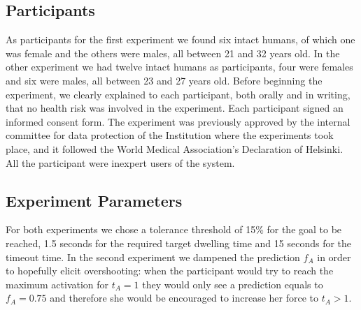 \subsection{Participants}\label{subsec:exp-participants}
As participants for the first experiment we found six intact humans, of which one was female and the others were males, all between 21 and 32 years old. In the other experiment we had twelve intact humans as participants, four were females and six were males, all between 23 and 27 years old. Before beginning the experiment, we clearly explained to each participant, both orally and in writing, that no health risk was involved in the experiment.  Each participant signed an informed consent form. The experiment was previously approved by the internal committee for data protection of the Institution where the experiments took place, and it followed the World Medical Association’s Declaration of Helsinki. All the participant were inexpert users of the system.
\subsection{Experiment Parameters}\label{subsec:exp-parameters}
For both experiments we chose a tolerance threshold of 15\% for the goal to be reached, 1.5 seconds for the required target dwelling time and 15 seconds for the timeout time. In the second experiment we dampened the prediction $f_A$ in order to hopefully elicit overshooting: when the participant would try to reach the maximum activation for $t_A = 1$ they would only see a prediction equals to $f_A = 0.75$ and therefore she would be encouraged to increase her force to $t_A > 1$.  

